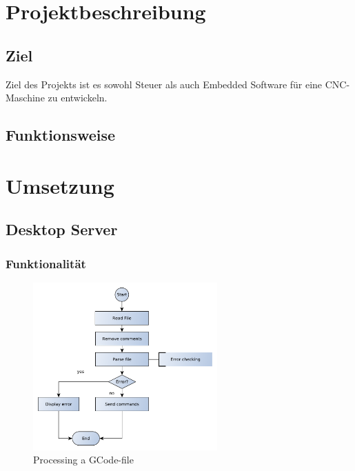 \documentclass[11pt,a4paper,bibtotoc,oneside]{scrbook}
\begin{document}
\tableofcontents\thispagestyle{empty}
\newpage

\setcounter{page}{1}
\chapter{Projektbeschreibung}

\section{Ziel}
Ziel des Projekts ist es sowohl Steuer als auch Embedded Software für eine CNC-Maschine zu entwickeln.

\section{Funktionsweise}

\chapter{Umsetzung}

\section{Desktop Server}
\subsection{Funktionalität}
    \begin{figure}[H]
    \centering
        \includegraphics[width=200pt]{./picture/process1.pdf}
        \caption{\label{main}{Processing a GCode-file}}
    \end{figure}
    
\end{document}
